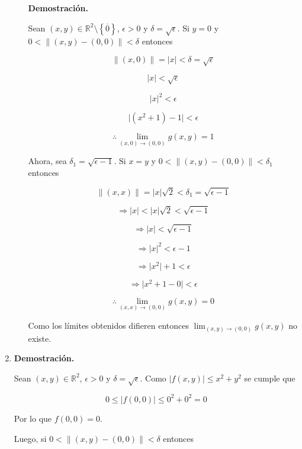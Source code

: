 \documentclass[fleqn]{article}
\begin{document}
\begin{enumerate}
\begin{enumerate}
            \textbf{Demostración.}

            Sean $ (x,y) \in \mathbb{R}^2 \setminus \left\lbrace \overline{0} \right\rbrace $, $ \epsilon > 0 $ y $ \delta = \sqrt{\epsilon} $. Si $ y = 0 $ y $ 0 < \lVert (x,y) - (0,0) \rVert < \delta $ entonces

            $$ \lVert (x,0) \rVert = \lvert x \rvert < \delta = \sqrt{\epsilon} $$

            $$ \lvert x \rvert < \sqrt{\epsilon} $$

            $$ \lvert x \rvert^2 < \epsilon $$

            $$ \lvert (x^2 + 1) - 1 \rvert < \epsilon $$

            $$ \therefore \lim_{(x,0) \to (0,0)} g(x,y) = 1 $$

            Ahora, sea $ \delta_1 = \sqrt{\epsilon - 1} $. Si $ x = y $ y $ 0 < \lVert (x,y) - (0,0) \rVert < \delta_1 $ entonces

            $$ \lVert (x,x) \rVert = \lvert x \rvert \sqrt{2} < \delta_1 = \sqrt{\epsilon - 1} $$

            $$ \Longrightarrow \lvert x \rvert < \lvert x \rvert \sqrt{2} < \sqrt{\epsilon - 1} $$

            $$ \Longrightarrow \lvert x \rvert < \sqrt{\epsilon - 1} $$

            $$ \Longrightarrow \lvert x \rvert^2 < \epsilon - 1 $$

            $$ \Longrightarrow \lvert x^2 \rvert + 1 < \epsilon $$

            $$ \Longrightarrow \lvert x^2 + 1 - 0 \rvert < \epsilon $$

            $$ \therefore \lim_{(x,x) \to (0,0)} g(x,y) = 0 $$

            Como los límites obtenidos difieren entonces $ \lim_{(x,y) \to (0,0)} g(x,y) $ no existe.
        \end{enumerate}

        \item \textbf{Demostración.}

        Sean $ (x,y) \in \mathbb{R}^2 $, $ \epsilon > 0 $ y $ \delta = \sqrt{\epsilon} $. Como $ \lvert f(x,y) \rvert \leq x^2 + y^2 $ se cumple que 

        $$ 0 \leq \lvert f(0,0) \rvert \leq 0^2 + 0^2 = 0 $$

        Por lo que $ f(0,0) = 0 $.

        Luego, si $ 0 < \lVert (x,y) - (0,0) \rVert < \delta $ entonces


\end{enumerate}
\end{document}
